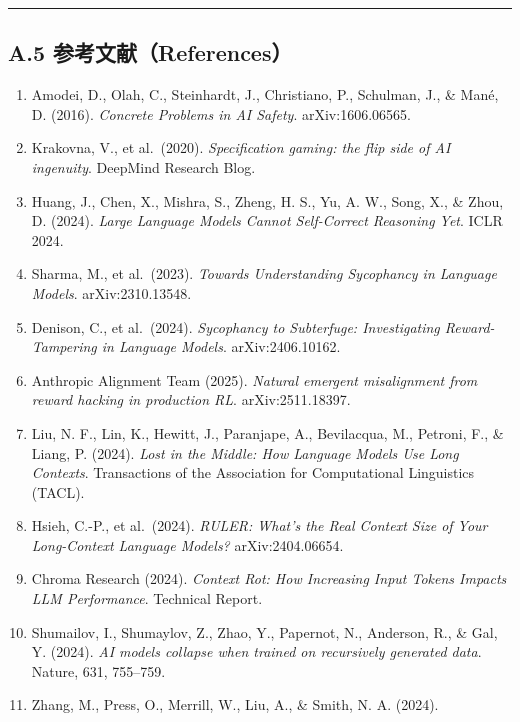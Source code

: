 \begin{center}\rule{0.5\linewidth}{0.5pt}\end{center}

\subsection{A.5
参考文献（References）}\label{a5-ux53c2ux8003ux6587ux732e-references}

\begin{enumerate}
\def\labelenumi{\arabic{enumi}.}
\tightlist
\item
  Amodei, D., Olah, C., Steinhardt, J., Christiano, P., Schulman, J., \&
  Mané, D. (2016). \emph{Concrete Problems in AI Safety}.
  arXiv:1606.06565.
\item
  Krakovna, V., et al.~(2020). \emph{Specification gaming: the flip side
  of AI ingenuity}. DeepMind Research Blog.
\item
  Huang, J., Chen, X., Mishra, S., Zheng, H. S., Yu, A. W., Song, X., \&
  Zhou, D. (2024). \emph{Large Language Models Cannot Self-Correct
  Reasoning Yet}. ICLR 2024.
\item
  Sharma, M., et al.~(2023). \emph{Towards Understanding Sycophancy in
  Language Models}. arXiv:2310.13548.
\item
  Denison, C., et al.~(2024). \emph{Sycophancy to Subterfuge:
  Investigating Reward-Tampering in Language Models}. arXiv:2406.10162.
\item
  Anthropic Alignment Team (2025). \emph{Natural emergent misalignment
  from reward hacking in production RL}. arXiv:2511.18397.
\item
  Liu, N. F., Lin, K., Hewitt, J., Paranjape, A., Bevilacqua, M.,
  Petroni, F., \& Liang, P. (2024). \emph{Lost in the Middle: How
  Language Models Use Long Contexts}. Transactions of the Association
  for Computational Linguistics (TACL).
\item
  Hsieh, C.-P., et al.~(2024). \emph{RULER: What's the Real Context Size
  of Your Long-Context Language Models?} arXiv:2404.06654.
\item
  Chroma Research (2024). \emph{Context Rot: How Increasing Input Tokens
  Impacts LLM Performance}. Technical Report.
\item
  Shumailov, I., Shumaylov, Z., Zhao, Y., Papernot, N., Anderson, R., \&
  Gal, Y. (2024). \emph{AI models collapse when trained on recursively
  generated data}. Nature, 631, 755--759.
\item
  Zhang, M., Press, O., Merrill, W., Liu, A., \& Smith, N. A. (2024).

\end{enumerate}
